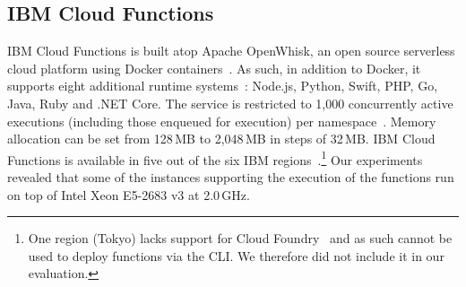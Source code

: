 
\subsection{IBM Cloud Functions}
\label{sec:ss:ibm}

\gls{IBM} Cloud Functions \cite{IBMFunctions} is built atop Apache OpenWhisk, an open source serverless cloud platform using Docker containers~\cite{OpenWhisk}. 
As such, in addition to Docker, it supports eight additional runtime systems~\cite{IBMRuntimes}: Node.js, Python, Swift, PHP, Go, Java, Ruby and .NET Core.
The service is restricted to 1,000 concurrently active executions (including those enqueued for execution) per namespace~\cite{IBMLimits}. 
Memory allocation can be set from 128\,\gls{MB} to 2,048\,\gls{MB} in steps of 32\,\gls{MB}. 
\gls{IBM} Cloud Functions is available in five out of the six IBM regions~\cite{IBMLocations}.\footnote{One region (Tokyo) lacks support for Cloud Foundry~\cite{IBMCloudFoundry} and as such cannot be used to deploy functions via the \gls{CLI}. We therefore did not include it in our evaluation.} 
Our experiments revealed that some of the instances supporting the execution of the functions run on top of Intel Xeon E5-2683 v3 at 2.0\,\gls{GHz}.



